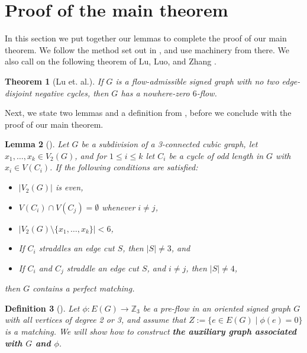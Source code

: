 \documentclass[12pt]{article}
\newcommand{\Z}{\mathbb{Z}}
\newtheorem{theorem}{Theorem}[]
\newtheorem{lemma}[theorem]{Lemma}
\newtheorem{definition}[theorem]{Definition}
\begin{document}
\section{Proof of the main theorem}\label{3ecmain}


In this section we put together our lemmas to complete the proof of our main theorem. We follow the method set out in \cite{devos2023nowherezero}, and use machinery from there. We also call on the following theorem of Lu, Luo, and Zhang \cite{LLZ}.

\begin{theorem}[Lu et. al.]\label{thm:no2disjNeg}
If $G$ is a flow-admissible signed graph with no two edge-disjoint negative cycles, then $G$ has a nowhere-zero $6$-flow.
\end{theorem}

Next, we state two lemmas and a definition from \cite{devos2023nowherezero}, before we conclude with the proof of our main theorem.



\begin{lemma}[\cite{devos2023nowherezero}]
\label{perfect_matching}
Let $G$ be a subdivision of a 3-connected cubic graph, let $x_1, \ldots, x_k \in V_2(G)$, and for $1 \le i \le k$ let $C_i$ be a cycle of odd length in $G$ with $x_i \in V(C_i)$.  If the following conditions are satisfied:
\begin{itemize}
\item $|V_2(G)|$ is even,
\item $V(C_i) \cap V(C_j) = \emptyset$ whenever $i \neq j$,
\item $|V_2(G) \setminus \{x_1, \ldots, x_k\}| < 6$,
\item If $C_i$ straddles an edge cut $S$, then $|S| \neq 3$, and
\item If $C_i$ and $C_j$ straddle an edge cut $S$, and $i \neq j$, then $|S| \neq 4$,
\end{itemize}
then $G$ contains a perfect matching.
\end{lemma}


\begin{definition}[\cite{devos2023nowherezero}]\label{def:auxGraph}
    Let $\phi : E(G) \rightarrow \Z_3$ be a pre-flow in an oriented signed graph $G$ with all vertices of degree 2 or 3, and assume that $Z := \{ e \in E(G) \mid \phi(e) = 0 \}$ is a matching. We will show how to construct \textbf{\emph{the auxiliary graph associated with $G$ and $\phi$}}.
\end{definition}
\end{document}
